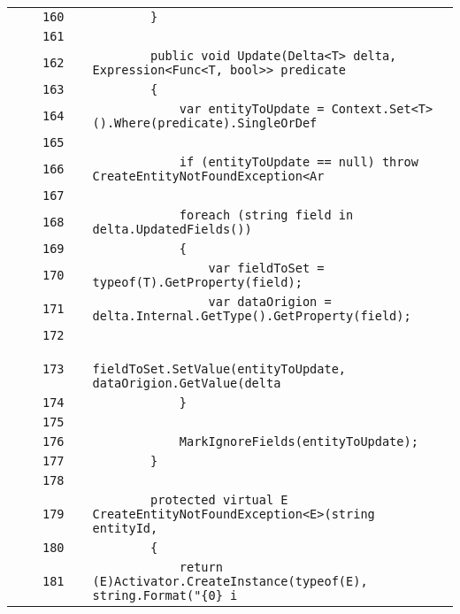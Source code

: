 \documentclass[a4paper,10pt]{article}
\begin{document}
\begin{longtable}[l]{lrrll}
\cellcolor{gray} &  & \verb~160~ & & \verb~        }~\\
\cellcolor{gray} &  & \verb~161~ & & \verb~~\\
\cellcolor{gray} &  & \verb~162~ & & \verb~        public void Update(Delta<T> delta, Expression<Func<T, bool>> predicate~\\
\cellcolor{gray} &  & \verb~163~ & & \verb~        {~\\
\cellcolor{gray} &  & \verb~164~ & & \verb~            var entityToUpdate = Context.Set<T>().Where(predicate).SingleOrDef~\\
\cellcolor{gray} &  & \verb~165~ & & \verb~~\\
\cellcolor{gray} &  & \verb~166~ & & \verb~            if (entityToUpdate == null) throw CreateEntityNotFoundException<Ar~\\
\cellcolor{gray} &  & \verb~167~ & & \verb~~\\
\cellcolor{gray} &  & \verb~168~ & & \verb~            foreach (string field in delta.UpdatedFields())~\\
\cellcolor{gray} &  & \verb~169~ & & \verb~            {~\\
\cellcolor{gray} &  & \verb~170~ & & \verb~                var fieldToSet = typeof(T).GetProperty(field);~\\
\cellcolor{gray} &  & \verb~171~ & & \verb~                var dataOrigion = delta.Internal.GetType().GetProperty(field);~\\
\cellcolor{gray} &  & \verb~172~ & & \verb~~\\
\cellcolor{gray} &  & \verb~173~ & & \verb~                fieldToSet.SetValue(entityToUpdate, dataOrigion.GetValue(delta~\\
\cellcolor{gray} &  & \verb~174~ & & \verb~            }~\\
\cellcolor{gray} &  & \verb~175~ & & \verb~~\\
\cellcolor{gray} &  & \verb~176~ & & \verb~            MarkIgnoreFields(entityToUpdate);~\\
\cellcolor{gray} &  & \verb~177~ & & \verb~        }~\\
\cellcolor{gray} &  & \verb~178~ & & \verb~~\\
\cellcolor{gray} &  & \verb~179~ & & \verb~        protected virtual E CreateEntityNotFoundException<E>(string entityId, ~\\
\cellcolor{gray} &  & \verb~180~ & & \verb~        {~\\
\cellcolor{gray} &  & \verb~181~ & & \verb~            return (E)Activator.CreateInstance(typeof(E), string.Format("{0} i~\\

\end{longtable}
\end{document}
